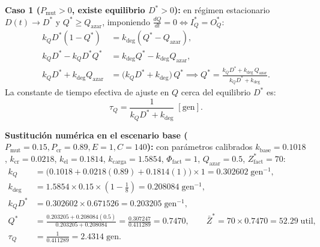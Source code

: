 \documentclass[11pt,a4paper]{article}
\begin{document}
\textbf{Caso 1 ($P_{\text{mut}} > 0$, existe equilibrio $D^* > 0$):} en r\'egimen estacionario $D(t) \to D^*$ y $Q^* \ge Q_{\text{azar}}$, imponiendo $\frac{dQ}{dt} = 0 \iff I_Q^* = O_Q^*$:
\begin{align}
k_Q D^*(1 - Q^*) &= k_{\text{deg}}(Q^* - Q_{\text{azar}}), \\
k_Q D^* - k_Q D^* Q^* &= k_{\text{deg}} Q^* - k_{\text{deg}} Q_{\text{azar}}, \\
k_Q D^* + k_{\text{deg}} Q_{\text{azar}} &= \big(k_Q D^* + k_{\text{deg}}\big)\,Q^* \implies
Q^* = \frac{k_Q D^* + k_{\text{deg}}\,Q_{\text{azar}}}{k_Q D^* + k_{\text{deg}}}.
\label{eq:Q_star}
\end{align}
La constante de tiempo efectiva de ajuste en $Q$ cerca del equilibrio $D^*$ es:
\begin{equation}
\tau_Q = \frac{1}{k_Q D^* + k_{\text{deg}}}\;[\text{gen}].
\end{equation}

\textbf{Sustituci\'on num\'erica en el escenario base ($P_{\text{mut}}=0.15, P_{\text{cr}}=0.89, E=1, C=140$):} con par\'ametros calibrados $k_{\text{base}}=0.1018$, $k_{\text{cr}}=0.0218$, $k_{\text{el}}=0.1814$, $k_{\text{carga}}=1.5854$, $\Phi_{\text{fact}}=1$, $Q_{\text{azar}}=0.5$, $Z^*_{\text{fact}}=70$:
\begin{align*}
k_Q &= \big(0.1018 + 0.0218(0.89) + 0.1814(1)\big)\times 1 = 0.302602\;\text{gen}^{-1}, \\
k_{\text{deg}} &= 1.5854 \times 0.15 \times \left(1 - \frac{1}{8}\right) = 0.208084\;\text{gen}^{-1}, \\
k_Q D^* &= 0.302602 \times 0.671526 = 0.203205\;\text{gen}^{-1}, \\
Q^* &= \frac{0.203205 + 0.208084(0.5)}{0.203205 + 0.208084} = \frac{0.307247}{0.411289} = 0.7470, \qquad
\bar{Z}^* = 70 \times 0.7470 = 52.29\;\text{util}, \\
\tau_Q &= \frac{1}{0.411289} = 2.4314\;\text{gen}.
\end{align*}
\end{document}
